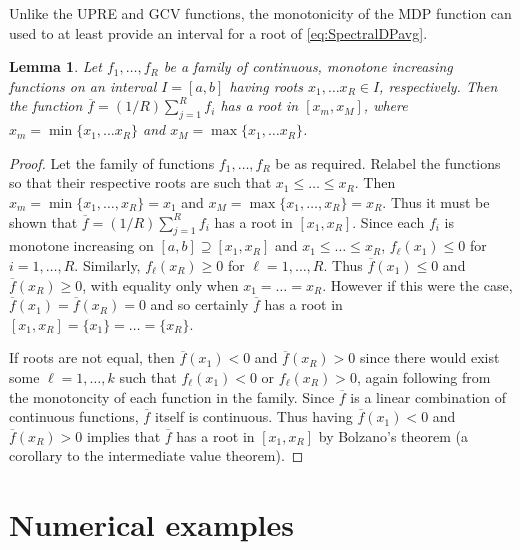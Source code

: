 \documentclass[12pt]{book}
\newtheorem{lemma}{Lemma}[section]
\begin{document}
Unlike the UPRE and GCV functions, the monotonicity of the MDP function can used to at least provide an interval for a root of \eqref{eq:SpectralDPavg}. 
\begin{lemma}
Let $f_1,\ldots,f_R$ be a family of continuous, monotone increasing functions on an interval $I = [a,b]$ having roots $x_1,\ldots x_R \in I$, respectively. Then the function $\overline{f} = (1/R)\sum_{j=1}^R f_i$ has a root in $[x_m,x_M]$, where $x_m = \min\{x_1,\ldots x_R\}$ and $x_M = \max\{x_1,\ldots x_R\}$.
\end{lemma}
\begin{proof}
Let the family of functions $f_1,\ldots,f_R$ be as required. Relabel the functions so that their respective roots are such that $x_1 \leq \ldots \leq x_R$. Then $x_m = \min\{x_1,\ldots,x_R\} = x_1$ and $x_M = \max\{x_1,\ldots,x_R\} = x_R$. Thus it must be shown that $\overline{f} = (1/R)\sum_{j=1}^R f_i$ has a root in $[x_1,x_R]$. Since each $f_i$ is monotone increasing on $[a,b] \supseteq [x_1,x_R]$ and $x_1 \leq \ldots \leq x_R$, $f_\ell(x_1) \leq 0$ for $i = 1,\ldots,R$. Similarly, $f_\ell(x_R) \geq 0$ for $\ell = 1,\ldots,R$. Thus $\overline{f}(x_1) \leq 0$ and $\overline{f}(x_R) \geq 0$, with equality only when $x_1 = \ldots = x_R$. However if this were the case, $\overline{f}(x_1) = \overline{f}(x_R) = 0$ and so certainly $\overline{f}$ has a root in $[x_1,x_R] = \{x_1\} = \ldots = \{x_R\}$. \par 
If roots are not equal, then $\overline{f}(x_1) < 0$ and $\overline{f}(x_R) > 0$ since there would exist some $\ell = 1,\ldots,k$ such that $f_\ell(x_1) < 0$ or $f_\ell(x_R) > 0$, again following from the monotoncity of each function in the family. Since $\overline{f}$ is a linear combination of continuous functions, $\overline{f}$ itself is continuous. Thus having $\overline{f}(x_1) < 0$ and $\overline{f}(x_R) > 0$ implies that $\overline{f}$ has a root in $[x_1,x_R]$ by Bolzano's theorem (a corollary to the intermediate value theorem).
\end{proof}

\chapter{Numerical examples} \label{sec:Numerical examples}
\end{document}
